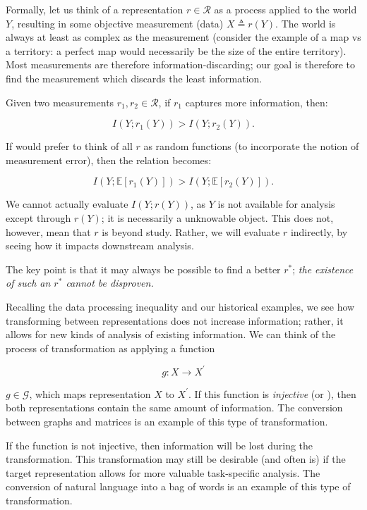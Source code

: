 \bigskip

Formally, let us think of a representation $r \in \mathcal{R}$ as a process applied to the world $Y$, resulting in some objective measurement (data) $X \triangleq r(Y)$.
The world is always at least as complex as the measurement (consider the example of a map vs a territory: a perfect map would necessarily be the size of the entire territory).
Most measurements are therefore information-discarding; our goal is therefore to find the measurement which discards the least information.

\bigskip

Given two measurements $r_1, r_2 \in \mathcal{R}$, if $r_1$ captures more information, then:

\[
I(Y; r_1(Y)) > I(Y; r_2(Y)).
\]

If would prefer to think of all $r$ as random functions (to incorporate the notion of measurement error), then the relation becomes:

\[
I(Y; \mathbb{E}[r_1(Y)]) > I(Y; \mathbb{E}[r_2(Y)]).
\]

We cannot actually evaluate $I(Y; r(Y))$, as $Y$ is not available for analysis except through $r(Y)$; it is necessarily a unknowable object.
This does not, however, mean that $r$ is beyond study.
Rather, we will evaluate $r$ indirectly, by seeing how it impacts downstream analysis.

The key point is that it may always be possible to find a better $r^*$; \textit{the existence of such an $r^*$ cannot be disproven.}

\bigskip

Recalling the data processing inequality and our historical examples, we see how transforming between representations does not increase information; rather, it allows for new kinds of analysis of existing information.
We can think of the process of transformation as applying a function

\[
g: X \rightarrow X^\prime
\]

$g \in \mathcal{G}$, which maps representation $X$ to $X^\prime$.
If this function is \textit{injective} (or ), then both representations contain the same amount of information.
The conversion between graphs and matrices is an example of this type of transformation.

If the function is not injective, then information will be lost during the transformation.
This transformation may still be desirable (and often is) if the target representation allows for more valuable task-specific analysis.
The conversion of natural language into a bag of words is an example of this type of transformation.

